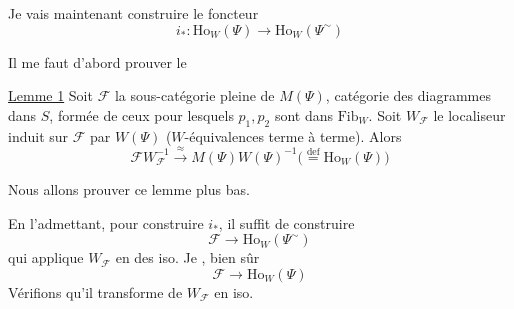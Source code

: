
Je vais maintenant construire le foncteur
\[
i_*\colon\mathrm{Ho}_W(\Psi)\longrightarrow\mathrm{Ho}_W(\Psi^{\sim})
\]

Il me faut  d'abord prouver le

\uline{Lemme 1} Soit $\mathscr F$ la sous-catégorie pleine de $M(\Psi)$, catégorie des diagrammes
dans $S$, formée de ceux pour lesquels $p_1,p_2$ sont dans $\mathrm{Fib}_W$. Soit $W_{\mathscr F}$ le localiseur induit sur $\mathscr F$ par $W(\Psi)$\unsure{,} ($W$-équivalences terme à terme). Alors
\[
\mathscr F W_{\mathscr F}^{-1}\xrightarrow{\approx}M(\Psi)W(\Psi)^{-1}
\bigl(\mathrel{\overset{\mathrm{def}}{=}}\mathrm{Ho}_W(\Psi)\bigr)
\]

Nous allons prouver ce lemme plus bas.

En l'admettant, pour construire $i_*$, il suffit de construire
\[
\mathscr F\longrightarrow\mathrm{Ho}_W(\Psi^{\sim})
\]
qui applique $W_{\mathscr F}$  en des iso. Je , bien sûr
\[
\mathscr F\longrightarrow\mathrm{Ho}_W(\Psi)
\]
Vérifions qu'il transforme  de $W_{\mathscr F}$ en iso.
